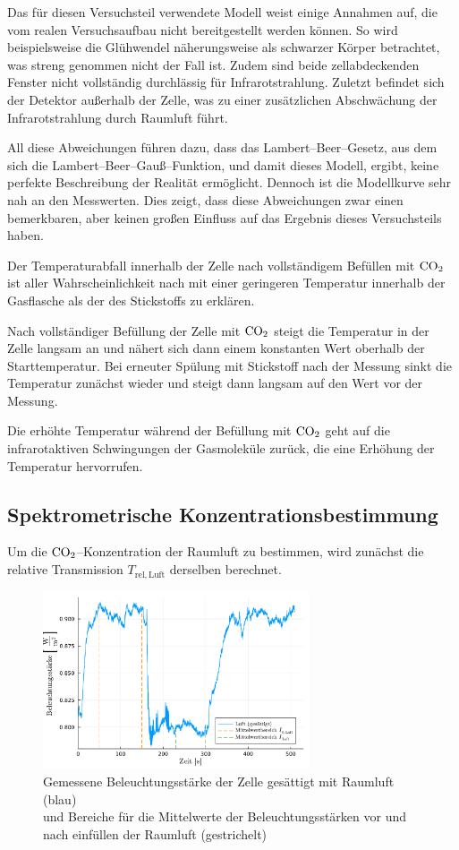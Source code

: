 \documentclass[12pt,a4paper]{scrartcl}
\numberwithin{equation}{section} %
\begin{document}
Das für diesen Versuchsteil verwendete Modell weist einige Annahmen auf, die vom realen Versuchsaufbau nicht bereitgestellt werden können. So wird beispielsweise die Glühwendel näherungsweise als schwarzer Körper betrachtet, was streng genommen nicht der Fall ist. Zudem sind beide zellabdeckenden Fenster nicht vollständig durchlässig für Infrarotstrahlung. Zuletzt befindet sich der Detektor außerhalb der Zelle, was zu einer zusätzlichen Abschwächung der Infrarotstrahlung durch Raumluft führt.

All diese Abweichungen führen dazu, dass das Lambert--Beer--Gesetz, aus dem sich die Lambert--Beer--Gauß--Funktion, und damit dieses Modell, ergibt, keine perfekte Beschreibung der Realität ermöglicht. Dennoch ist die Modellkurve sehr nah an den Messwerten. Dies zeigt, dass diese Abweichungen zwar einen bemerkbaren, aber keinen großen Einfluss auf das Ergebnis dieses Versuchsteils haben.

Der Temperaturabfall innerhalb der Zelle nach vollständigem Befüllen mit $\ce{CO_2}$ ist aller Wahrscheinlichkeit nach mit einer geringeren Temperatur innerhalb der Gasflasche als der des Stickstoffs zu erklären.

Nach vollständiger Befüllung der Zelle mit $\ce{CO_2}$ steigt die Temperatur in der Zelle langsam an und nähert sich dann einem konstanten Wert oberhalb der Starttemperatur. Bei erneuter Spülung mit Stickstoff nach der Messung sinkt die Temperatur zunächst wieder und steigt dann langsam auf den Wert vor der Messung.

Die erhöhte Temperatur während der Befüllung mit $\ce{CO_2}$ geht auf die infrarotaktiven Schwingungen der Gasmoleküle zurück, die eine Erhöhung der Temperatur hervorrufen.

\subsection{Spektrometrische Konzentrationsbestimmung}
\label{Spektrometrische Konzentrationsbestimmung}

Um die $\ce{CO_2}$--Konzentration der Raumluft zu bestimmen, wird zunächst die relative Transmission $T_\mathrm{rel, Luft}$ derselben berechnet.

\begin{figure}[h]
	\centering
	\includegraphics[width=0.7\textwidth]{../media/B1.1/luft.pdf}
	\caption{Gemessene Beleuchtungsstärke der Zelle gesättigt mit Raumluft (blau)\\
		und Bereiche für die Mittelwerte der Beleuchtungsstärken vor und nach einfüllen der Raumluft (gestrichelt)}
	\label{fig:luft}
\end{figure}
\end{document}
